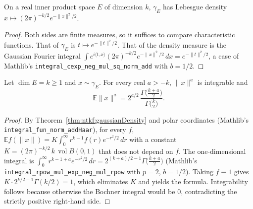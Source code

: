 \begin{theorem}\label{thm:ntkf:gaussianDensity}
  \leanok
On a real inner product space $E$ of dimension $k$, $\gamma_E$ has Lebesgue density $x\mapsto(2\pi)^{-k/2}e^{-\|x\|^2/2}$.
\end{theorem}

\begin{proof}
  \leanok
Both sides are finite measures, so it suffices to compare characteristic functions. That of $\gamma_E$ is $t\mapsto e^{-\|t\|^2/2}$.
That of the density measure is the Gaussian Fourier integral
$\int e^{i\langle t,x\rangle}(2\pi)^{-k/2}e^{-\|x\|^2/2}\,dx=e^{-\|t\|^2/2}$, a case of Mathlib's
\texttt{integral\_cexp\_neg\_mul\_sq\_norm\_add} with $b=1/2$.
\end{proof}

\begin{theorem}\label{thm:ntkf:radialMoments}
  \leanok
Let $\dim E=k\ge1$ and $x\sim\gamma_E$. For every real $a>-k$, $\|x\|^a$ is integrable and
\[
  \mathbb E\|x\|^a=2^{a/2}\,\frac{\Gamma\bigl(\tfrac{k+a}2\bigr)}{\Gamma\bigl(\tfrac k2\bigr)} .
\]
\end{theorem}

\begin{proof}
  \leanok
By Theorem~\ref{thm:ntkf:gaussianDensity} and polar coordinates (Mathlib's \texttt{integral\_fun\_norm\_addHaar}), for every $f$,
$\mathbb Ef(\|x\|)=K\int_0^\infty r^{k-1}f(r)e^{-r^2/2}\,dr$ with a constant $K=(2\pi)^{-k/2}\,k\,\operatorname{vol}B(0,1)$ that does not depend
on $f$. The one-dimensional integral is $\int_0^\infty r^{k-1+a}e^{-r^2/2}\,dr=2^{(k+a)/2-1}\Gamma\bigl(\tfrac{k+a}2\bigr)$ (Mathlib's
\texttt{integral\_rpow\_mul\_exp\_neg\_mul\_rpow} with $p=2$, $b=1/2$). Taking $f\equiv1$ gives $K\cdot2^{k/2-1}\Gamma(k/2)=1$, which
eliminates $K$ and yields the formula. Integrability follows because otherwise the Bochner integral would be $0$, contradicting the
strictly positive right-hand side.
\end{proof}

